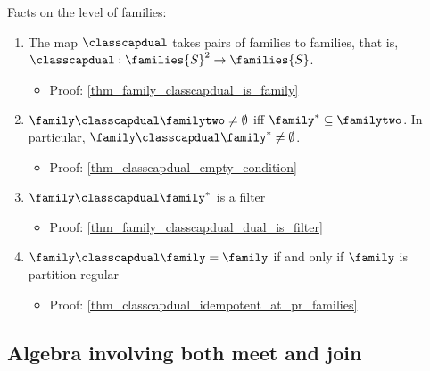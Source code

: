 Facts on the level of families:
\begin{enumerate}
    \item The map $\classcapdual$ takes pairs of families to families, that is, $\classcapdual: \families{S}^2 \to \families{S}$.
    \begin{itemize}
        \item Proof: \cref{thm_family_classcapdual_is_family}
    \end{itemize}

    \item {} $\family \classcapdual \familytwo \neq \emptyset$ iff $\family^* \subseteq \familytwo$. In particular, $\family \classcapdual \family^* \neq \emptyset$.
    \begin{itemize}
        \item Proof: \cref{thm_classcapdual_empty_condition}
    \end{itemize}

    \item $\family \classcapdual \family^*$ is a filter
    \begin{itemize}
        \item Proof: \cref{thm_family_classcapdual_dual_is_filter}
    \end{itemize}

    \item $\family \classcapdual \family = \family$ if and only if $\family$ is partition regular
    \begin{itemize}
        \item Proof: \cref{thm_classcapdual_idempotent_at_pr_families}
    \end{itemize}    
\end{enumerate}

\subsection{Algebra involving both meet and join}


